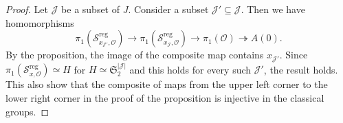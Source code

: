 \documentclass{amsart}
\theoremstyle{definition}
\DeclareMathOperator{\reg}{reg}
\newcommand{\cS}{\mathcal{S}}
\newcommand{\frakm}{\mathfrak{m}}
\newcommand{\g}{\mathfrak{g}}
\newcommand{\frakS}{\mathfrak{S}}
\newcommand{\0}{\mathcal{O}}
\begin{document}
\begin{proof}
Let $\mathcal J$ be a subset of $J$.
Consider a subset $\mathcal J' \subseteq \mathcal J$. 
Then we have homomorphisms
$$\pi_1(\cS^{\reg}_{x_{\mathcal J'}, \0}) \to \pi_1(\cS^{\reg}_{x_{\mathcal J}, \0}) \to
\pi_1(\0) \twoheadrightarrow A(0).$$  
By the proposition, the image of the composite map contains $x_{\mathcal J'}$.
Since $\pi_1(\cS^{\reg}_{x, \0}) \simeq H$  for $H \simeq
\frakS_2^{|\mathcal J|}$ and this holds for every such $\mathcal J'$,
the result holds.
This also show that the composite of maps from the upper left corner to the lower right corner in the proof of the proposition is injective in the classical groups.
\end{proof}

\end{document}
